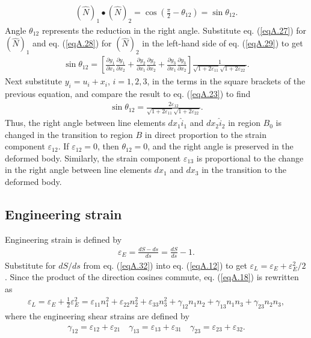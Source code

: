 \documentclass{AeroStructure-ERJohnson}
\begin{document}
\begin{align}\label{eqA.29}
(\hat{N})_{1} \bullet (\hat{N})_{2}=\cos \left(\frac{\pi}{2}-\theta_{12}\right)=\sin \theta_{12}.
\end{align}
Angle $\theta_{12}$ represents the reduction in the right angle. Substitute eq. (\ref{eqA.27}) for $(\hat{N})_{1}$ and eq. (\ref{eqA.28}) for $(\hat{N})_{2}$ in the left-hand side of eq. (\ref{eqA.29}) to get
\begin{align}\label{eqA.30}
\sin \theta_{12}=\left[\frac{\partial y_{1}}{\partial x_{1}} \frac{\partial y_{1}}{\partial x_{2}}+\frac{\partial y_{2}}{\partial x_{1}} \frac{\partial y_{2}}{\partial x_{2}}+\frac{\partial y_{3}}{\partial x_{1}} \frac{\partial y_{3}}{\partial x_{2}}\right] \frac{1}{\sqrt{1+2 \varepsilon_{11}} \sqrt{1+2 \varepsilon_{22}}}.
\end{align}
Next substitute $y_{i}=u_{i}+x_{i}$, $i=1,2,3$, in the terms in the square brackets of the previous equation, and compare the result to eq. (\ref{eqA.23}) to find
\begin{align}\label{eqA.31}
\sin \theta_{12}=\frac{2 \varepsilon_{12}}{\sqrt{1+2 \varepsilon_{11}} \sqrt{1+2 \varepsilon_{22}}}.
\end{align}
Thus, the right angle between line elements $d x_{1} \hat{i}_{1}$ and $d x_{2} \hat{i}_{2}$ in region $B_{0}$ is changed in the transition to region $B$ in direct proportion to the strain component $\varepsilon_{12}$. If $\varepsilon_{12}=0$, then $\theta_{12}=0$, and the right angle is preserved in the deformed body. Similarly, the strain component $\varepsilon_{13}$ is proportional to the change in the right angle between line   elements $dx_{1}$ and $dx_{3}$ in the transition to the deformed body.

\subsection{Engineering strain}\label{secA.1.2}

Engineering strain is defined by
\begin{align}\label{eqA.32}
\varepsilon_{E}=\frac{d S-d s}{d s}=\frac{d S}{d s}-1.
\end{align}
Substitute for $d S / d s$ from eq. (\ref{eqA.32}) into eq. (\ref{eqA.12}) to get $\varepsilon_{L}=\varepsilon_{E}+\varepsilon_{E}^{2} / 2$. Since the product of the direction cosines commute, eq. (\ref{eqA.18}) is rewritten as
\begin{align}\label{eqA.33}
\varepsilon_{L}=\varepsilon_{E}+\frac{1}{2} \varepsilon_{E}^{2}=\varepsilon_{11} n_{1}^{2}+\varepsilon_{22} n_{2}^{2}+\varepsilon_{33} n_{3}^{2}+\gamma_{12} n_{1} n_{2}+\gamma_{13} n_{1} n_{3}+\gamma_{23} n_{2} n_{3},
\end{align}
where the engineering shear strains are defined by
\begin{align}\label{eqA.34}
\gamma_{12}=\varepsilon_{12}+\varepsilon_{21} \quad \gamma_{13}=\varepsilon_{13}+\varepsilon_{31} \quad \gamma_{23}=\varepsilon_{23}+\varepsilon_{32}.
\end{align}
\end{document}
